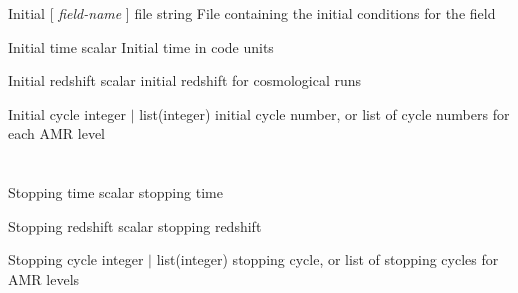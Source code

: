 \documentclass{book}
\begin{document}
\Parameter
{Initial}
{[ \textit{field-name} ]}
{file}
{string}
{}
{File containing the initial conditions for the field}
{}
{}

\Parameter
{Initial}
{}
{time}
{scalar}
{}
{Initial time in code units}
{}
{}

\Parameter
{Initial}
{}
{redshift}
{scalar}
{}
{initial redshift for cosmological runs}
{}
{}

\Parameter
{Initial}
{}
{cycle}
{integer $|$ list(integer)}
{}
{initial cycle number, or list of cycle numbers for each AMR level}
{}
{}

\section{}

\Parameter
{Stopping}
{}
{time}
{scalar}
{}
{stopping time}
{}
{}

\Parameter
{Stopping}
{}
{redshift}
{scalar}
{}
{stopping redshift}
{}
{}
{}

\Parameter
{Stopping}
{}
{cycle}
{integer $|$ list(integer)}
{}
{stopping cycle, or list of stopping cycles for AMR levels}
{}


\section{}
\end{document}
